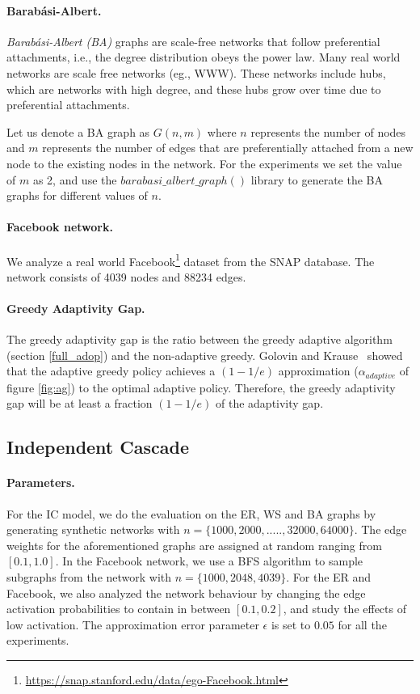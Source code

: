 \paragraph{Barabási-Albert.}

\textit{Barabási-Albert (BA)} graphs \cite{barabasi} are scale-free networks that follow preferential attachments, i.e., the degree distribution obeys the power law. Many real world networks are scale free networks (eg., WWW). These networks include hubs, which are networks with high degree, and these hubs grow over time due to preferential attachments. 

Let us denote a BA graph as $G(n,m)$ where $n$ represents the number of nodes and $m$ represents the number of edges that are preferentially attached from a new node to the existing nodes in the network. For the experiments we set the value of $m$ as 2, and use the $barabasi\_albert\_graph()$ library to generate the BA graphs for different values of $n$.


\paragraph{Facebook network.}

We analyze a real world Facebook\footnote{\url{https://snap.stanford.edu/data/ego-Facebook.html}} dataset from the SNAP database. The network consists of 4039 nodes and 88234 edges.

\paragraph{Greedy Adaptivity Gap.} 

The greedy adaptivity gap is the ratio between the greedy adaptive algorithm (section \ref{full_adop}) and the non-adaptive greedy. Golovin and Krause~\cite{Golovin2011a} showed that the adaptive greedy policy achieves a $(1-1/e)$ approximation ($\alpha_{adaptive}$ of figure \ref{fig:ag}) to the optimal adaptive policy. Therefore, the greedy adaptivity gap will be at least a fraction $(1-1/e)$ of the adaptivity gap. 



\subsection{Independent Cascade}

\paragraph{Parameters.}
For the IC model, we do the evaluation on the ER, WS and BA graphs by generating synthetic networks with $n= \{1000, 2000,....., 32000, 64000\}$. The edge weights for the aforementioned graphs are assigned at random ranging from $[0.1,1.0]$.
In the Facebook network, we use a BFS algorithm to sample subgraphs from the network with $n =\{1000, 2048, 4039\}$. For the ER and Facebook, we also analyzed the network behaviour by changing the edge activation probabilities to contain in between $[0.1,0.2]$, and study the effects of low activation. The approximation error parameter $\epsilon$ is set to $0.05$ for all the experiments.

